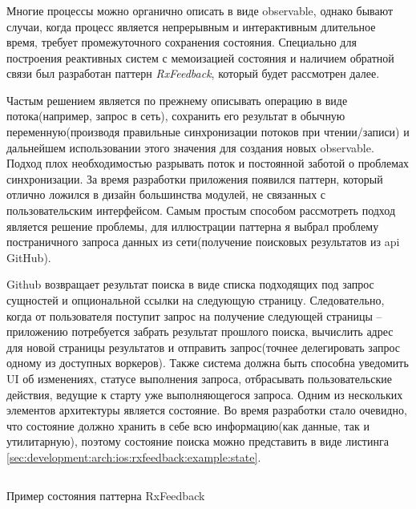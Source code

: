 \subsubsection{}
\label{sec:development:arch:ios:rxfeedback}

Многие процессы можно органично описать в виде \gls{observable}, однако бывают случаи, когда процесс является непрерывным и интерактивным длительное время, требует промежуточного сохранения состояния. Специально для построения реактивных систем с мемоизацией состояния и наличием обратной связи был разработан паттерн \emph{RxFeedback}, который будет рассмотрен далее.

Частым решением является по прежнему описывать операцию в виде потока(например, запрос в сеть), сохранить его результат в обычную переменную(производя правильные синхронизации потоков при чтении/записи) и дальнейшем использовании этого значения для создания новых \gls{observable}. Подход плох необходимостью разрывать поток и постоянной заботой о проблемах синхронизации. За время разработки приложения появился паттерн, который отлично ложился в дизайн большинства модулей, не связанных с пользовательским интерфейсом.
Самым простым способом рассмотреть подход является решение проблемы, для иллюстрации паттерна я выбрал проблему постраничного запроса данных из сети(получение поисковых результатов из \gls{api} GitHub).

Github возвращает результат поиска в виде списка подходящих под запрос сущностей и опциональной ссылки на следующую страницу. Следовательно, когда от пользователя поступит запрос на получение следующей страницы -- приложению потребуется забрать результат прошлого поиска, вычислить адрес для новой страницы результатов и отправить запрос(точнее делегировать запрос одному из доступных воркеров). Также система должна быть способна уведомить UI об изменениях, статусе выполнения запроса, отбрасывать пользовательские действия, ведущие к старту уже выполняющегося запроса.
Одним из нескольких элементов архитектуры является состояние. Во время разработки стало очевидно, что состояние должно хранить в себе всю информацию(как данные, так и утилитарную), поэтому состояние поиска можно представить в виде листинга \ref{sec:development:arch:ios:rxfeedback:example:state}.

\begin{code}
  \inputminted{swift}{inc/src/rx-feedback-state.swift}
   \caption{Пример состояния паттерна RxFeedback}
   \label{sec:development:arch:ios:rxfeedback:example:state}
\end{code}

